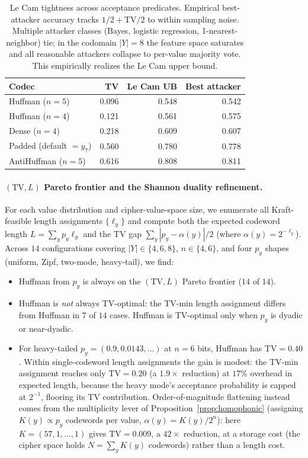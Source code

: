 \documentclass[11pt]{article}
\theoremstyle{definition}
\theoremstyle{plain}
\theoremstyle{remark}
\begin{document}
\begin{table}[ht]
\centering
\small
\begin{tabular}{lrrr}
\toprule
Codec & TV & Le Cam UB & Best attacker \\
\midrule
Huffman ($n = 5$)        & 0.096 & 0.548 & 0.542 \\
Huffman ($n = 4$)        & 0.121 & 0.561 & 0.575 \\
Dense ($n = 4$)          & 0.218 & 0.609 & 0.607 \\
Padded (default $= y_7$) & 0.560 & 0.780 & 0.778 \\
AntiHuffman ($n = 5$)    & 0.616 & 0.808 & 0.811 \\
\bottomrule
\end{tabular}
\caption{Le Cam tightness across acceptance predicates.  Empirical
best-attacker accuracy tracks $1/2 + \mathrm{TV}/2$ to within
sampling noise.  Multiple attacker classes (Bayes, logistic
regression, 1-nearest-neighbor) tie; in the codomain
$|Y| = 8$ the feature space saturates and all reasonable attackers
collapse to per-value majority vote.  This empirically realizes
the Le Cam upper bound.}
\label{tab:le-cam-tight}
\end{table}

\paragraph{$(\mathrm{TV}, L)$ Pareto frontier and the Shannon
duality refinement.}
For each value distribution and cipher-value-space size, we enumerate
all Kraft-feasible length assignments $\{\ell_y\}$ and compute both
the expected codeword length $L = \sum_y p_y \ell_y$ and the TV gap
$\sum_y |p_y - \alpha(y)|/2$ (where $\alpha(y) = 2^{-\ell_y}$).
Across $14$ configurations covering $|Y| \in \{4, 6, 8\}$,
$n \in \{4, 6\}$, and four $p_y$ shapes (uniform, Zipf, two-mode,
heavy-tail), we find:
\begin{itemize}
\item Huffman from $p_y$ is always on the $(\mathrm{TV}, L)$ Pareto
    frontier ($14$ of $14$).
\item Huffman is \emph{not} always TV-optimal: the TV-min length
    assignment differs from Huffman in $7$ of $14$ cases.  Huffman is
    TV-optimal only when $p_y$ is dyadic or near-dyadic.
\item For heavy-tailed $p_y = (0.9, 0.0143, \ldots)$ at $n = 6$ bits,
    Huffman has $\mathrm{TV} = 0.40$.  Within single-codeword length
    assignments the gain is modest: the TV-min assignment reaches only
    $\mathrm{TV} = 0.20$ (a $1.9\times$ reduction) at $17\%$ overhead in
    expected length, because the heavy mode's acceptance probability is
    capped at $2^{-1}$, flooring its TV contribution.  Order-of-magnitude
    flattening instead comes from the multiplicity lever of
    Proposition~\ref{prop:homophonic} (assigning $K(y) \propto p_y$
    codewords per value, $\alpha(y) = K(y)/2^n$): here
    $K = (57, 1, \ldots, 1)$ gives $\mathrm{TV} = 0.009$, a $42\times$
    reduction, at a storage cost (the cipher space holds
    $N = \sum_y K(y)$ codewords) rather than a length cost.
\end{itemize}
\end{document}
